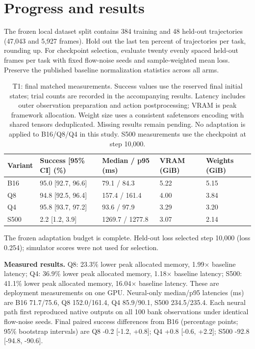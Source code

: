 \documentclass[10pt,a4paper]{article}
\begin{document}
\section{Progress and results}
The frozen local dataset split contains 384 training and 48 held-out trajectories (47,043 and 5,927 frames). Hold out the last ten percent of trajectories per task, rounding up. For checkpoint selection, evaluate twenty evenly spaced held-out frames per task with fixed flow-noise seeds and sample-weighted mean loss. Preserve the published baseline normalization statistics across all arms.
\begin{table}[ht]
\centering\small
\begin{tabular}{@{}lllll@{}}
\toprule
Variant & Success [95\% CI] (\%) & Median / p95 (ms) & VRAM (GiB) & Weights (GiB) \\
\midrule
B16 & 95.0 [92.7, 96.6] & 79.1 / 84.3 & 5.22 & 5.15 \\
Q8 & 94.8 [92.5, 96.4] & 157.4 / 161.4 & 4.00 & 3.84 \\
Q4 & 95.8 [93.7, 97.2] & 93.6 / 97.9 & 3.29 & 3.20 \\
S500 & 2.2 [1.2, 3.9] & 1269.7 / 1277.8 & 3.07 & 2.14 \\
\bottomrule
\end{tabular}
\caption{T1: final matched measurements. Success values use the reserved final initial states; trial counts are recorded in the accompanying results. Latency includes outer observation preparation and action postprocessing; VRAM is peak framework allocation. Weight size uses a consistent safetensors encoding with shared tensors deduplicated. Missing results remain pending. No adaptation is applied to B16/Q8/Q4 in this study. S500 measurements use the checkpoint at step 10,000.}
\end{table}



The frozen adaptation budget is complete. Held-out loss selected step 10,000 (loss 0.254); simulator scores were not used for selection.

\textbf{Measured results.} Q8: 23.3\% lower peak allocated memory, 1.99$\times$ baseline latency; Q4: 36.9\% lower peak allocated memory, 1.18$\times$ baseline latency; S500: 41.1\% lower peak allocated memory, 16.04$\times$ baseline latency. These are deployment measurements on one GPU. Neural-only median/p95 latencies (ms) are B16 71.7/75.6, Q8 152.0/161.4, Q4 85.9/90.1, S500 234.5/235.4. Each neural path first reproduced native outputs on all 100 bank observations under identical flow-noise seeds. Final paired success differences from B16 (percentage points; 95\% bootstrap intervals) are Q8 -0.2 [-1.2, +0.8]; Q4 +0.8 [-0.6, +2.2]; S500 -92.8 [-94.8, -90.6].
\end{document}
